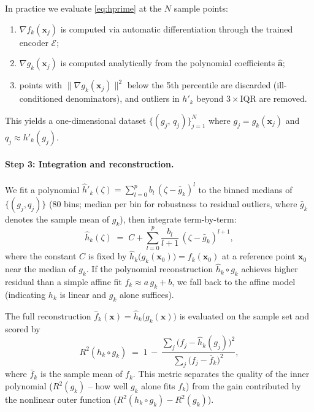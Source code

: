 \documentclass{article}
\newcommand{\x}{\bm{x}}
\begin{document}
In practice we evaluate \eqref{eq:hprime} at the $N$ sample points:
\begin{enumerate}[nosep]
    \item $\nabla f_k(\x_j)$ is computed via automatic differentiation
          through the trained encoder $\mathcal{E}$;
    \item $\nabla g_k(\x_j)$ is computed analytically from the polynomial
          coefficients $\hat{\bm{a}}$;
    \item points with $\|\nabla g_k(\x_j)\|^2$ below the 5th percentile are
          discarded (ill-conditioned denominators), and outliers in $h'_k$
          beyond $3\times\mathrm{IQR}$ are removed.
\end{enumerate}
This yields a one-dimensional dataset $\{(g_j,\,q_j)\}_{j=1}^N$ where
$g_j = g_k(\x_j)$ and $q_j \approx h'_k(g_j)$.

\paragraph{Step 3: Integration and reconstruction.}
We fit a polynomial
$\hat{h}'_k(\zeta) = \sum_{l=0}^{p} b_l\,(\zeta - \bar g_k)^l$  to the binned medians of $\{(g_j,q_j)\}$ ($80$ bins; median
per bin for robustness to residual outliers, where $\bar g_k$ denotes the
sample mean of $g_k$), then integrate term-by-term:
\begin{equation}\label{eq:h-integrate}
  \hat{h}_k(\zeta) \;=\; C + \sum_{l=0}^{p}\frac{b_l}{l+1}\,
                                     (\zeta - \bar g_k)^{l+1},
\end{equation}
where the constant $C$ is fixed by $\hat h_k\bigl(g_k(\x_0)\bigr) = f_k(\x_0)$
at a reference point $\x_0$ near the median of $g_k$. If the polynomial
reconstruction $\hat h_k\circ g_k$ achieves higher residual than a simple
affine fit $f_k\approx a\,g_k + b$, we fall back to the affine model
(indicating $h_k$ is linear and $g_k$ alone suffices).

The full reconstruction $\hat f_k(\x) = \hat h_k\bigl(g_k(\x)\bigr)$ is
evaluated on the sample set and scored by
\begin{equation*}
    R^2(h_k\circ g_k)
    \;=\; 1 \,-\, \frac{\sum_j \bigl(f_j - \hat h_k(g_j)\bigr)^2}
                       {\sum_j \bigl(f_j - \bar f_k\bigr)^2},
\end{equation*}
where $\bar f_k$ is the sample mean of $f_k$. This metric separates the
quality of the inner polynomial ($R^2(g_k)$ -- how well $g_k$ alone fits
$f_k$) from the gain contributed by the nonlinear outer function
($R^2(h_k\circ g_k) - R^2(g_k)$).
\end{document}
